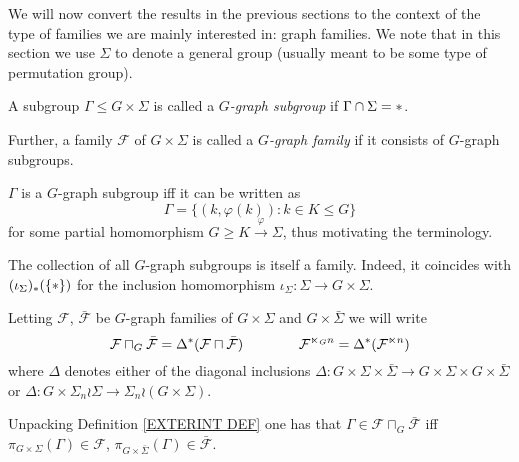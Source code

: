 \documentclass[a4paper,10pt]{article}%
\begin{document}
We will now convert the results in the previous sections to the context of the type of families we are mainly interested in: graph families. 
We note that in this section we use $\Sigma$ to denote a general group (usually meant to be some type of permutation group).


\begin{definition}
A subgroup $\Gamma \leq G \times \Sigma$ is called a
\textit{$G$-graph subgroup} if $\Gamma \cap \Sigma = \**$. 

Further, a family $\mathcal{F}$ of $G \times \Sigma$ is called a \textit{$G$-graph family} if it consists of $G$-graph subgroups.
\end{definition}


\begin{remark}\label{GRAPH REM}
$\Gamma$ is a $G$-graph subgroup iff it can be written as
\[
	\Gamma = 
	\{
	(k,\varphi(k)) : k \in K \leq G
	\}
\]
for some partial homomorphism $G \geq K \xrightarrow{\varphi} \Sigma$, thus motivating the terminology.
\end{remark}


\begin{remark}
	The collection of all $G$-graph subgroups is itself a family. Indeed, it coincides with 
	$(\iota_{\Sigma})_{\**}(\{\**\})$
for the inclusion homomorphism 
$\iota_{\Sigma} \colon \Sigma \to G \times \Sigma$.
\end{remark}


\begin{notation}\label{SEMIDIRG NOT}
Letting $\mathcal{F}$, $\bar{\mathcal{F}}$ be $G$-graph families of $G \times \Sigma$ and $G \times \bar{\Sigma}$ we will write
\[
	\mathcal{F} \sqcap_G \bar{\mathcal{F}} 
	= \Delta^{\**} (\mathcal{F} \sqcap \bar{\mathcal{F}} )
\qquad \qquad
	\mathcal{F}^{\ltimes_G n} = \Delta^{\**} (\mathcal{F}^{\ltimes n})
\]
where $\Delta$ denotes either of the diagonal inclusions
$\Delta \colon 
G \times \Sigma \times \bar{\Sigma} \to 
G \times \Sigma \times G \times \bar{\Sigma}$
or 
$\Delta \colon G \times \Sigma_n \wr \Sigma \to 
\Sigma_n \wr (G \times \Sigma)$.
\end{notation}


\begin{remark}\label{UNPACKINGSQCAP REM}
	Unpacking Definition \ref{EXTERINT DEF} one has that 
	$\Gamma \in \mathcal{F} \sqcap_G \bar{\mathcal{F}}$ iff
	$\pi_{G \times \Sigma}(\Gamma) \in \mathcal{F}$,
	$\pi_{G \times \bar{\Sigma}}(\Gamma) \in \bar{\mathcal{F}}$.
\end{remark}
\end{document}
